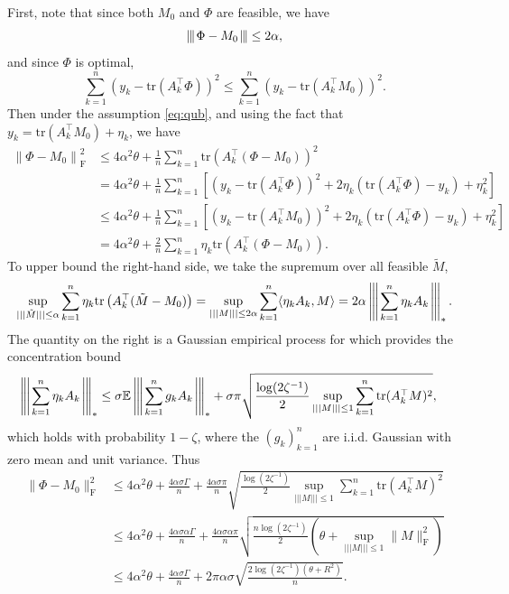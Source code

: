 \documentclass[11pt]{article}
\newcommand{\xspace}{\hbox{\kern-2.5pt}}
\newcommand\tnorm[1]{\left\vert\xspace\left\vert\xspace\left\vert\mskip2mu
#1\mskip2mu \right\vert\xspace\right\vert\xspace\right\vert}
\newcommand{\norm}[1]{\left \|#1 \right \|}
\newcommand{\E}{\mathbb{E}}
\begin{document}
First, note that since both $M_0$ and $\Phi$ are feasible, we have 
\[
	\tnorm{\Phi-M_0}\leq 2\alpha,
\]
and since $\Phi$ is optimal, 
\begin{equation*}
	\sum_{k=1}^n \left( y_k - \mathrm{tr}(A_k^\top \Phi)\right )^2 \leq 
	\sum_{k=1}^n \left( y_k - \mathrm{tr}(A_k^\top M_0)\right )^2.
\end{equation*} 
Then under the assumption \eqref{eq:qub}, and using the fact that $y_k=\mathrm{tr}(A_k^\top M_0) + \eta_k$, we have
\begin{align*}
	\norm{\Phi - M_0}_\mathrm{F}^2  
	& \leq 4 \alpha^2 \theta + \frac{1}{n} \sum_{k=1}^n\mathrm{tr}(A_k^\top(\Phi - M_0))^2 \\
	&= 4 \alpha^2 \theta + \frac{1}{n} \sum_{k=1}^n \left[ (y_k-\mathrm{tr}(A_k^\top\Phi))^2 + 2\eta_k(\mathrm{tr}(A_k^\top\Phi)-y_k) + \eta_k^2 \right] \\
	&\leq 4 \alpha^2 \theta + \frac{1}{n} \sum_{k=1}^n \left[ (y_k-\mathrm{tr}(A_k^\top M_0))^2 + 2\eta_k(\mathrm{tr}(A_k^\top\Phi)-y_k) + \eta_k^2 \right] \\
	&= 4 \alpha^2 \theta + \frac{2}{n} \sum_{k=1}^n \eta_k\mathrm{tr}(A_k^\top(\Phi - M_0)).
\end{align*}
To upper bound the right-hand side, we take the supremum over all feasible $\tilde{M}$,
\[
	\sup_{\vert\vert\vert \tilde{M} \vert\vert\vert \leq \alpha} \sum_{k=1}^n \eta_k\mathrm{tr}\left(A_k^\top(\tilde{M} - M_0)\right) 
	= \sup_{\vert\vert\vert M \vert\vert\vert \leq 2 \alpha} \sum_{k=1}^n \langle \eta_k A_k, M \rangle 
	= 2\alpha \tnorm{\sum_{k=1}^n \eta_k A_k }_*.
\]
The quantity on the right is a Gaussian empirical process for which \cite[Theorem~4.7]{pisier1999volume} provides the concentration bound
\begin{align*}
	\tnorm{\sum_{k=1}^n \eta_{k} A_{k}}_{*} &
	\leq \sigma\E \tnorm{\sum_{k=1}^n g_{k} A_{k} }_{*} + \sigma\pi \sqrt{\frac{\log(2\zeta^{-1})}{2} \sup_{\vert\vert\vert M \vert\vert\vert \leq 1} \sum_{k=1}^n \mathrm{tr}(A_{k}^\top M)^2 },
\end{align*}
which holds with probability $1-\zeta$, where the $(g_k)_{k=1}^n$ are i.i.d. Gaussian with zero mean and unit variance. 
Thus
\begin{align*}
	\| \Phi - M_0\|_\mathrm{F}^2 
	&\leq 4 \alpha^2 \theta + \frac{4\alpha\sigma\Gamma}{n} + \frac{4\alpha\sigma\pi}{n} \sqrt{\frac{\log(2\zeta^{-1})}{2} \sup_{ \vert\vert\vert M \vert\vert\vert \leq 1} \sum_{k=1}^n \mathrm{tr}(A_{k}^\top M)^2 } \\
	&\leq 4 \alpha^2 \theta + \frac{4\alpha\sigma\alpha\Gamma}{n} + \frac{4\alpha\sigma\alpha\pi}{n} \sqrt{\frac{n\log(2\zeta^{-1})}{2}
		\left(\theta + \sup_{  \vert\vert\vert M \vert\vert\vert\leq 1}\|M\|_\mathrm{F}^2\right)} \\
	&\leq 4 \alpha^2 \theta + \frac{4\alpha\sigma\Gamma}{n} + 2\pi\alpha\sigma \sqrt{\frac{2\log(2\zeta^{-1})\left(\theta + R^2\right)}{n}}.
\end{align*}
\end{document}

